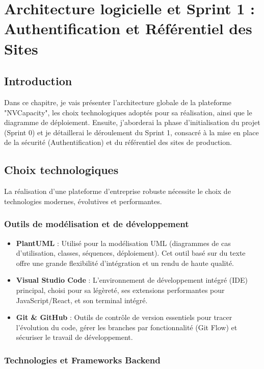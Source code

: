 \chapter{Architecture logicielle et Sprint 1 : Authentification et Référentiel des Sites}

\section*{Introduction}

Dans ce chapitre, je vais présenter l'architecture globale de la plateforme "NVCapacity", les choix technologiques adoptés pour sa réalisation, ainsi que le diagramme de déploiement. Ensuite, j'aborderai la phase d'initialisation du projet (Sprint 0) et je détaillerai le déroulement du Sprint 1, consacré à la mise en place de la sécurité (Authentification) et du référentiel des sites de production.

\section{Choix technologiques}

La réalisation d'une plateforme d'entreprise robuste nécessite le choix de technologies modernes, évolutives et performantes.

\subsection{Outils de modélisation et de développement}

\begin{itemize}[label=\textbullet]
    \item \textbf{PlantUML} : Utilisé pour la modélisation UML (diagrammes de cas d'utilisation, classes, séquences, déploiement). Cet outil basé sur du texte offre une grande flexibilité d'intégration et un rendu de haute qualité.
    \item \textbf{Visual Studio Code} : L'environnement de développement intégré (IDE) principal, choisi pour sa légèreté, ses extensions performantes pour JavaScript/React, et son terminal intégré.
    \item \textbf{Git \& GitHub} : Outils de contrôle de version essentiels pour tracer l'évolution du code, gérer les branches par fonctionnalité (Git Flow) et sécuriser le travail de développement.
\end{itemize}

\subsection{Technologies et Frameworks Backend}

